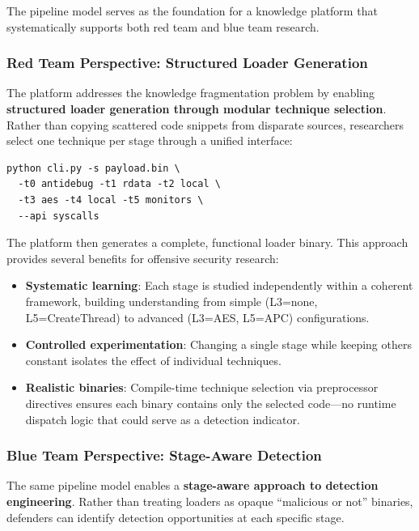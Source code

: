 \documentclass[10pt,a4paper,twocolumn]{article}
\begin{document}
The pipeline model serves as the foundation for a knowledge platform that systematically supports both red team and blue team research.

\subsubsection{Red Team Perspective: Structured Loader Generation}

The platform addresses the knowledge fragmentation problem by enabling \textbf{structured loader generation through modular technique selection}.
Rather than copying scattered code snippets from disparate sources, researchers select one technique per stage through a unified interface:

\begin{lstlisting}[basicstyle=\ttfamily\scriptsize, numbers=none, frame=none]
python cli.py -s payload.bin \
  -t0 antidebug -t1 rdata -t2 local \
  -t3 aes -t4 local -t5 monitors \
  --api syscalls
\end{lstlisting}

The platform then generates a complete, functional loader binary.
This approach provides several benefits for offensive security research:

\begin{itemize}[leftmargin=*, itemsep=1pt]
    \item \textbf{Systematic learning}: Each stage is studied independently within a coherent framework, building understanding from simple (L3=none, L5=CreateThread) to advanced (L3=AES, L5=APC) configurations.
    \item \textbf{Controlled experimentation}: Changing a single stage while keeping others constant isolates the effect of individual techniques.
    \item \textbf{Realistic binaries}: Compile-time technique selection via preprocessor directives ensures each binary contains only the selected code---no runtime dispatch logic that could serve as a detection indicator.
\end{itemize}

\subsubsection{Blue Team Perspective: Stage-Aware Detection}

The same pipeline model enables a \textbf{stage-aware approach to detection engineering}.
Rather than treating loaders as opaque ``malicious or not'' binaries, defenders can identify detection opportunities at each specific stage.
\end{document}
